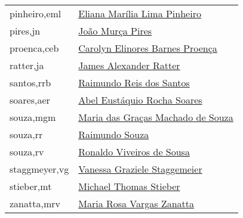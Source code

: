 \begin{longtable}{l l}
pinheiro,eml        & \hyperlink{http://lattes.cnpq.br/7238835279276067}{Eliana Marília Lima Pinheiro} \\
pires,jn            & \hyperlink{https://plants.jstor.org/stable/10.5555/al.ap.person.bm000006559}{João Murça Pires} \\
proenca,ceb         & \hyperlink{http://lattes.cnpq.br/8243382046974477}{Carolyn Elinores Barnes Proença} \\
ratter,ja           & \hyperlink{https://plants.jstor.org/stable/10.5555/al.ap.person.bm000023562}{James Alexander Ratter} \\
santos,rrb          & \hyperlink{https://plants.jstor.org/stable/10.5555/al.ap.person.bm000032907}{Raimundo Reis dos Santos} \\
soares,aer          & \hyperlink{http://lattes.cnpq.br/4908757546415140}{Abel Eustáquio Rocha Soares} \\
souza,mgm           & \hyperlink{http://lattes.cnpq.br/2817470874123772}{Maria das Graças Machado de Souza} \\
souza,rr            & \hyperlink{https://plants.jstor.org/stable/10.5555/al.ap.person.bm000055998 }{Raimundo Souza} \\
souza,rv            & \hyperlink{http://lattes.cnpq.br/2008471425847512}{Ronaldo Viveiros de Sousa} \\
staggmeyer,vg       & \hyperlink{http://lattes.cnpq.br/4357034543526737}{Vanessa Graziele Staggemeier} \\
stieber,mt          & \hyperlink{https://plants.jstor.org/stable/10.5555/al.ap.person.bm000010969}{Michael Thomas Stieber} \\
zanatta,mrv         & \hyperlink{http://lattes.cnpq.br/5981278331253704}{Maria Rosa Vargas Zanatta} \\
      \hline
\end{longtable}